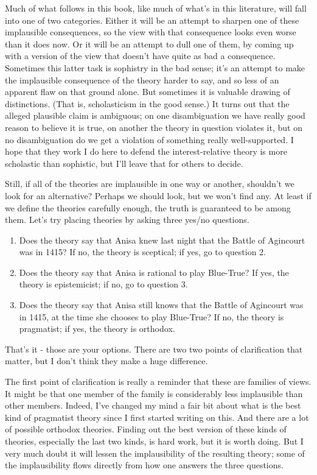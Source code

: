 \documentclass[11pt,]{book}
\providecommand{\tightlist}{%
  \setlength{\itemsep}{0pt}\setlength{\parskip}{0pt}}
\begin{document}
Much of what follows in this book, like much of what's in this literature, will fall into one of two categories. Either it will be an attempt to sharpen one of these implausible consequences, so the view with that consequence looks even worse than it does now. Or it will be an attempt to dull one of them, by coming up with a version of the view that doesn't have quite as bad a consequence. Sometimes this latter task is sophistry in the bad sense; it's an attempt to make the implausible consequence of the theory harder to say, and so less of an apparent flaw on that ground alone. But sometimes it is valuable drawing of distinctions. (That is, scholasticism in the good sense.) It turns out that the alleged plausible claim is ambiguous; on one disambiguation we have really good reason to believe it is true, on another the theory in question violates it, but on no disambiguation do we get a violation of something really well-supported. I hope that they work I do here to defend the interest-relative theory is more scholastic than sophistic, but I'll leave that for others to decide.

Still, if all of the theories are implausible in one way or another, shouldn't we look for an alternative? Perhaps we should look, but we won't find any. At least if we define the theories carefully enough, the truth is guaranteed to be among them. Let's try placing theories by asking three yes/no questions.

\begin{enumerate}
\def\labelenumi{\arabic{enumi}.}
\tightlist
\item
  Does the theory say that Anisa knew last night that the Battle of Agincourt was in 1415? If no, the theory is sceptical; if yes, go to question 2.
\item
  Does the theory say that Anisa is rational to play Blue-True? If yes, the theory is epistemicist; if no, go to question 3.
\item
  Does the theory say that Anisa still knows that the Battle of Agincourt was in 1415, at the time she chooses to play Blue-True? If no, the theory is pragmatist; if yes, the theory is orthodox.
\end{enumerate}

That's it - those are your options. There are two two points of clarification that matter, but I don't think they make a huge difference.

The first point of clarification is really a reminder that these are families of views. It might be that one member of the family is considerably less implausible than other members. Indeed, I've changed my mind a fair bit about what is the best kind of pragmatist theory since I first started writing on this. And there are a lot of possible orthodox theories. Finding out the best version of these kinds of theories, especially the last two kinds, is hard work, but it is worth doing. But I very much doubt it will lessen the implausibility of the resulting theory; some of the implausibility flows directly from how one answers the three questions.
\end{document}
